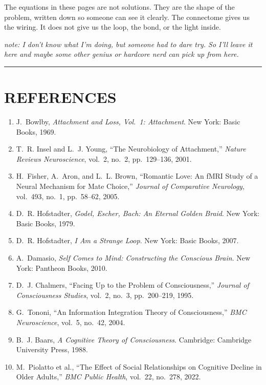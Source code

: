 \documentclass[11pt,a4paper]{article}
\newcommand{\nbk}[1]{\par\vspace{0.3em}\noindent\textit{note: #1}\par\vspace{0.3em}}
\begin{document}
The equations in these pages are not solutions. They are the shape of the problem, written down so someone can see it clearly. The connectome gives us the wiring. It does not give us the loop, the bond, or the light inside.

\nbk{I don't know what I'm doing, but someone had to dare try. So I'll leave it here and maybe some other genius or hardcore nerd can pick up from here.}

\vspace{0.4em}
\noindent\rule{\textwidth}{0.4pt}

\section*{REFERENCES}

\begin{enumerate}
\setlength{\itemsep}{0.35em}

\item J.~Bowlby, \textit{Attachment and Loss, Vol.~1: Attachment}. New York: Basic Books, 1969.

\item T.~R. Insel and L.~J. Young, ``The Neurobiology of Attachment,''
\textit{Nature Reviews Neuroscience}, vol.~2, no.~2, pp.~129--136, 2001.

\item H.~Fisher, A.~Aron, and L.~L. Brown, ``Romantic Love: An fMRI Study of a Neural Mechanism for Mate Choice,''
\textit{Journal of Comparative Neurology}, vol.~493, no.~1, pp.~58--62, 2005.

\item D.~R. Hofstadter, \textit{Godel, Escher, Bach: An Eternal Golden Braid}. New York: Basic Books, 1979.

\item D.~R. Hofstadter, \textit{I Am a Strange Loop}. New York: Basic Books, 2007.

\item A.~Damasio, \textit{Self Comes to Mind: Constructing the Conscious Brain}. New York: Pantheon Books, 2010.

\item D.~J. Chalmers, ``Facing Up to the Problem of Consciousness,''
\textit{Journal of Consciousness Studies}, vol.~2, no.~3, pp.~200--219, 1995.

\item G.~Tononi, ``An Information Integration Theory of Consciousness,''
\textit{BMC Neuroscience}, vol.~5, no.~42, 2004.

\item B.~J. Baars, \textit{A Cognitive Theory of Consciousness}. Cambridge: Cambridge University Press, 1988.

\item M.~Piolatto et al., ``The Effect of Social Relationships on Cognitive Decline in Older Adults,''
\textit{BMC Public Health}, vol.~22, no.~278, 2022.

\end{enumerate}
\end{document}
